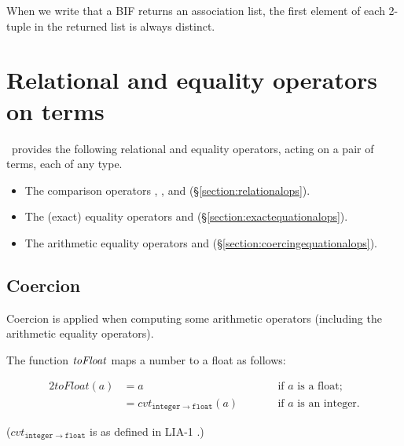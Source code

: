 When we write that a BIF returns an association list, the first element of
each 2-tuple in the returned list is always distinct.

\section{Relational and equality operators on terms}

\Erlang\ provides the following relational and equality operators, acting on a pair of terms,
each of any type.
\begin{itemize}
\item The comparison operators \T{<}, \T{=<}, \T{>} and
\T{>=} (\S\ref{section:relationalops}).
\item The (exact) equality operators \T{=:=} and \T{=/=}
(\S\ref{section:exactequationalops}).
\item The arithmetic equality operators \T{==} and \T{/=}
(\S\ref{section:coercingequationalops}).
\end{itemize}

\subsection{Coercion}

\label{section:coercion}

Coercion is applied when computing some arithmetic operators (including
the arithmetic equality operators).

The function ${\it toFloat}$ maps a number to a float as follows:
\iftrue
\begin{alignat*}{2}
\mathit{toFloat}(a) &= a && \qquad\text{if $a$ is a float;} \\
                    &= \mathit{cvt}_{\mathtt{integer}\rightarrow\mathtt{float}}(a) && \qquad\text{if $a$ is an integer.}
\end{alignat*}
\else
\[\I{toFloat}(a)=\begin{cases} a & \text{if $a$ is a float;} \\
\I{cvt}_{\mathtt{integer}\rightarrow\mathtt{float}}(a) & \text{if $a$ is an integer.}
\end{cases}\]
\fi
(${cvt}_{\mathtt{integer}\rightarrow\mathtt{float}}$ is as defined in LIA-1
\cite{lia-1}.)

